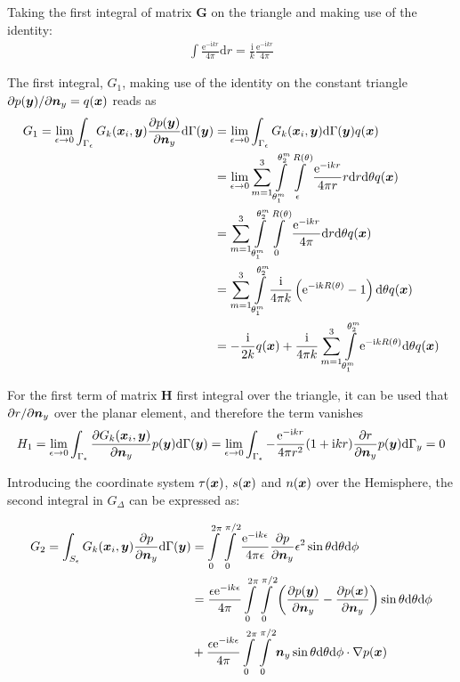 \documentclass[a4paper, 10pt]{article}
\newcommand{\te}{\mathrm{e}}
\newcommand{\ti}{\mathrm{i}}
\newcommand{\td}{\mathrm{d}}
\newcommand{\sx}{\bm{\mathnormal{x}}}
\newcommand{\sy}{\bm{\mathnormal{y}}}
\newcommand{\sn}{\bm{\mathnormal{n}}}
\newcommand{\bH}{\mathbf{H}}
\newcommand{\bG}{\mathbf{G}}
\newcommand{\limeps}{\lim\limits_{\epsilon \rightarrow 0}}
\newcommand{\intsph}{\int\limits_{0}^{2\pi} \int\limits_{0}^{\pi/2}}
\newcommand{\drph}{\mathrm{d} r \mathrm{d}\theta}
\newcommand{\summ}{\sum\limits_{m=1}^3}
\newcommand{\intme}{\int\limits_{\theta_1^m}^{\theta_2^m}\int\limits_\epsilon^{R(\theta)}}
\newcommand{\intmn}{\int\limits_{\theta_1^m}^{\theta_2^m}\int\limits_0^{R(\theta)}}
\newcommand{\intms}{\int\limits_{\theta_1^m}^{\theta_2^m}}
\begin{document}
Taking the first integral of matrix $\bG$ on the triangle and making use of the identity:
%
\begin{align}
	\int \frac{\te ^{-\ti kr}}{4 \pi} \mathrm{d} r = \frac{\ti}{ k} \frac{\te ^{-\ti kr}}{4 \pi}
\end{align}

The first integral, $G_1$, making use of the identity on the constant triangle $\partial p(\sy) / \partial \sn_y = q(\sx)$ reads as
%
\begin{align}
	G_1 = \limeps \int_{\Gamma_\epsilon} G_k(\sx_i,\sy) \frac{\partial p(\sy)}{\partial \sn_y} \td \Gamma(\sy) 
	& = \limeps \int_{\Gamma_\epsilon} G_k(\sx_i,\sy) \td \Gamma(\sy) q(\sx) \nonumber \\
	& = \limeps \summ \intme \frac{\te ^{- \ti k r}}{4 \pi r} r \drph q(\sx) \nonumber \\
	& = \summ \intmn \frac{\te^{-\ti kr}}{4 \pi} \drph q(\sx) \nonumber \\
	& = \summ \intms \frac{\ti}{4\pi k}\left(\te^{-\ti k R(\theta)} -1\right) \mathrm{d} \theta q(\sx) \nonumber \\
    & = -\frac{\ti}{2k} q(\sx) + \frac{\ti}{4\pi k}\summ \intms \te ^{-\ti kR(\theta)} \mathrm{d} \theta q(\sx)
\end{align}

For the first term of matrix $\bH$ first integral over the triangle, it can be used that $\partial r / \partial \sn_y$ over the planar element, and therefore the term vanishes
%
\begin{align}
	H_1 = \limeps \int_{\Gamma_\epsilon}\frac{\partial{G}_k (\sx_i, \sy)}{\partial \sn_y} p(\sy) \td \Gamma(\sy) =
	\limeps \int_{\Gamma_\epsilon}-\frac{\te ^{-\ti k r}}{4 \pi r^2}(1 + \ti kr) \frac{\partial r}{\partial \sn_y} p(\sy) \mathrm{d} \Gamma_y = 0
\end{align}

Introducing the coordinate system $\tau(\sx)$, $s(\sx)$ and $n(\sx)$ over the Hemisphere, the second integral in $G_\Delta$ can be expressed as:

\begin{align}
	G_2 = \int_{S_\epsilon} G_k(\sx_i, \sy) \frac{\partial p}{\partial \sn_y} \td \Gamma(\sy) & = \intsph \frac{\te^{-\ti k \epsilon}}{4 \pi \epsilon} \frac{\partial p}{\partial \sn_y} \epsilon^2 \sin \theta \mathrm{d} \theta \mathrm{d} \phi \nonumber \\
	& = \frac{\epsilon \te ^{-\ti k \epsilon}}{4 \pi} \intsph \left(\frac{\partial p(\sy)}{\partial \sn_y} -\frac{\partial p(\sx)}{\partial \sn_y} \right) \sin \theta \mathrm{d} \theta \mathrm{d} \phi \nonumber \\
	& + \frac{\epsilon \te ^{-\ti k \epsilon}}{4 \pi} \intsph \sn_y \sin \theta \mathrm{d} \theta \mathrm{d} \phi \cdot \nabla p(\sx)
\end{align}
\end{document}
